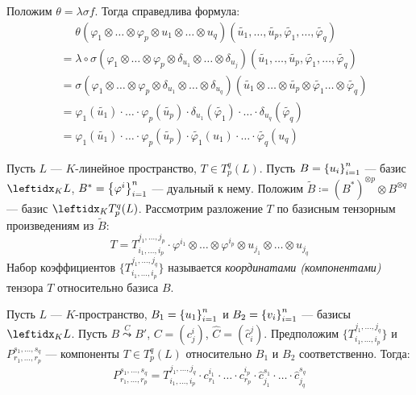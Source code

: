 \begin{rem}
\begin{enumerate}
        Положим $\theta = \lambda \sigma f$. Тогда справедлива формула:
        \begin{align*}
            &\phantom{{}={}} \theta(\varphi_1 \otimes \ldots \otimes \varphi_p \otimes u_1 \otimes \ldots \otimes u_q)(\tilde{u_1}, \ldots, \tilde{u_p}, \tilde{\varphi_1}, \ldots, \tilde{\varphi_q}) \\
            &= \lambda \circ \sigma(\varphi_1 \otimes \ldots \otimes \varphi_p \otimes \delta_{u_1} \otimes \ldots \otimes \delta_{u_j})(\tilde{u_1}, \ldots, \tilde{u_p}, \tilde{\varphi_1}, \ldots, \tilde{\varphi_q}) \\
            &= \sigma(\varphi_1 \otimes \ldots \otimes \varphi_p \otimes \delta_{u_1} \otimes \ldots \otimes \delta_{u_q})(\tilde{u_1} \otimes \ldots \otimes \tilde{u_p} \otimes \tilde{\varphi_1} \ldots \otimes \tilde{\varphi_q}) \\
            &= \varphi_1(\tilde{u_1}) \cdot \ldots \cdot \varphi_p(\tilde{u_p}) \cdot \delta_{u_1}(\tilde{\varphi_1}) \cdot \ldots \cdot \delta_{u_q}(\tilde{\varphi_q}) \\
            &= \varphi_1(\tilde{u_1}) \cdot \ldots \cdot \varphi_p(\tilde{u_p}) \cdot \tilde{\varphi_1}(u_1) \cdot \ldots \cdot \tilde{\varphi_q}(u_q)
        \end{align*}
    \end{enumerate}
\end{rem}

\begin{defn}
    Пусть $L$ --- $K$-линейное пространство, $T \in T_p^q(L)$. Пусть $B = \left\{u_i\right\}_{i=1}^{n}$ --- базис $\lsub{K}{L}$, $B^* = \left\{\varphi^i\right\}_{i=1}^{n}$ --- дуальный к нему. Положим $\tilde{B} \coloneqq (B^*)^{\otimes p} \otimes B^{\otimes q}$ --- базис $\lsub{K}{T_p^q(L)}$. Рассмотрим разложение $T$ по базисным тензорным произведениям из $\tilde{B}$:
    $$T = T_{i_1, \dots, i_p}^{j_1, \dots, j_p} \cdot \varphi^{i_1} \otimes \ldots \otimes \varphi^{i_p} \otimes u_{j_1} \otimes \ldots \otimes u_{j_q}$$
    Набор коэффициентов $\{T_{i_1, \dots, i_p}^{j_1, \dots, j_q}\}$ называется \textit{координатами (компонентами)} тензора $T$ относительно базиса $B$.
\end{defn}

\begin{thm*}
    Пусть $L$ --- $K$-пространство, $B_1 = \left\{u_1\right\}_{i=1}^{n}$ и $B_2 = \left\{v_i\right\}_{i=1}^{n}$ --- базисы $\lsub{K}{L}$. Пусть $B \stackrel{C}{\leadsto} B'$, $C = (c_j^i)$, $\hat{C} = (\hat{c}_i^j)$. Предположим $\{T_{i_1, \dots, i_p}^{j_1, \dots, j_q}\}$ и $P_{r_1, \dots, r_p}^{s_1, \dots, s_q}$ --- компоненты $T \in T_p^q(L)$ относительно $B_1$ и $B_2$ соответственно. Тогда:
    $$P_{r_1, \dots, r_p}^{s_1, \dots, s_q} = T_{i_1, \dots, i_p}^{j_1, \dots, j_q} \cdot c_{r_1}^{i_1} \cdot \ldots \cdot c_{r_p}^{i_p} \cdot \hat{c}_{j_1}^{s_1} \cdot \ldots \cdot \hat{c}_{j_q}^{s_q}$$
\end{thm*}

